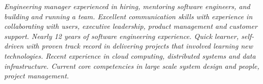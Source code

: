 {\selectfont
\textit{Engineering manager experienced in hiring, mentoring software engineers, and building and running a team. Excellent communication skills with experience in collaborating with users, executive leadership, product management and customer support. Nearly 12 years of software engineering experience. Quick learner, self-driven with proven track record in delivering projects that involved learning new technologies. Recent experience in cloud computing, distributed systems and data infrastructure. Current core competencies in large scale system design and people, project management.}
}